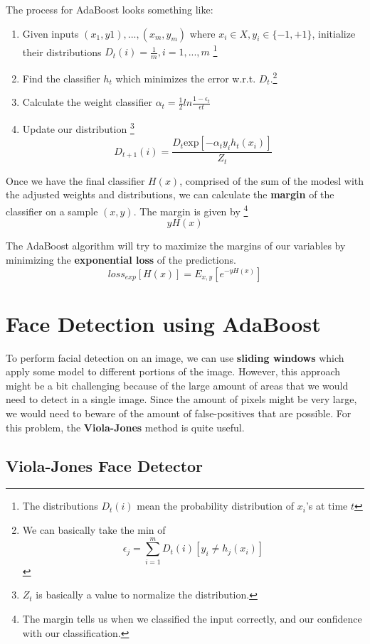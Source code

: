 \documentclass{tufte-handout}
\begin{document}
The process for AdaBoost looks something like:
\begin{enumerate}
	\item Given inputs $(x_{1}, y{1}),...,(x_{m},y_{m})$ where $x_{i} \in X, y_{i} \in\{-1, +1\}$,
			initialize their distributions $D_{t}(i)= \frac{1}{m}, i = 1,...,m$
			\footnote{The distributions $D_{t}(i)$ mean the probability distribution of $x_{i}$'s at time $t$}
	\item Find the classifier $h_{t}$ which minimizes the error w.r.t. $D_{t}$.\footnote{We can basically take
			the min of 
				\[\epsilon_{j} = \sum_{i = 1}^{m}D_{t}(i)[y_{i} \neq h_{j}(x_{i})]\]}
	\item Calculate the weight classifier $\alpha_{t} = \frac{1}{2}ln\frac{1 - \epsilon_{t}}{\epsilon{t}}$
	\item Update our distribution \footnote{ $Z_{t}$ is basically a value to normalize the distribution.}
			\[ D_{t + 1}(i) = \frac{D_{t}\textrm{exp}[-\alpha_{t}y_{i}h_{t}(x_{i})]}{Z_{t}} \]
\end{enumerate}

Once we have the final classifier $H(x)$, comprised of the sum of the modesl with the adjusted weights and
distributions, we can calculate the \textbf{margin} of the classifier on a sample $(x, y)$. The margin is
given by \footnote{The margin tells us when we classified the input correctly, and our confidence with our 
classification.}
\[yH(x)\]

The AdaBoost algorithm will try to maximize the margins of our variables by minimizing the 
\textbf{exponential loss} of the predictions.
\[loss_{exp}[H(x)]= E_{x,y}[e^{-yH(x)}]\]

\section{Face Detection using AdaBoost}
To perform facial detection on an image, we can use \textbf{sliding windows} which apply some model to 
different portions of the image. However, this approach might be a bit challenging because of the 
large amount of areas that we would need to detect in a single image. Since the amount of pixels might be
very large, we would need to beware of the amount of false-positives that are possible. For this problem,
the \textbf{Viola-Jones} method is quite useful.
\subsection{Viola-Jones Face Detector}
\end{document}

